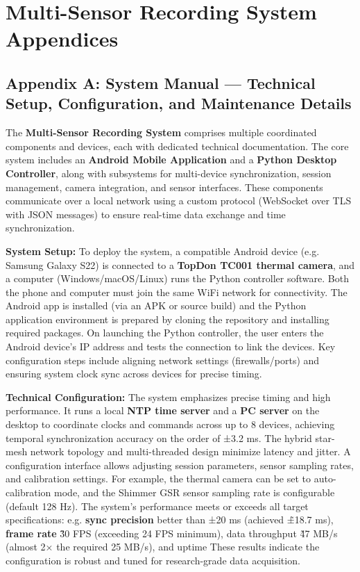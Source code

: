 \chapter{Multi-Sensor Recording System Appendices}

\section{Appendix A: System Manual --- Technical Setup, Configuration, and Maintenance Details}

The \textbf{Multi-Sensor Recording System} comprises multiple coordinated
components and devices, each with dedicated technical documentation. The
core system includes an \textbf{Android Mobile Application} and a \textbf{Python
Desktop Controller}, along with subsystems for multi-device
synchronization, session management, camera integration, and sensor
interfaces\cite{ref1}.
These components communicate over a local network using a custom
protocol (WebSocket over TLS with JSON messages) to ensure real-time
data exchange and time
synchronization\cite{ref2}.

\textbf{System Setup:} To deploy the system, a compatible Android device
(e.g. Samsung Galaxy S22) is connected to a \textbf{TopDon TC001 thermal
camera}, and a computer (Windows/macOS/Linux) runs the Python
controller
software\cite{ref3}.
Both the phone and computer must join the same WiFi network for
connectivity\cite{ref4}.
The Android app is installed (via an APK or source build) and the Python
application environment is prepared by cloning the repository and
installing required
packages\cite{ref5}.
On launching the Python controller, the user enters the Android
device's IP address and tests the connection to link the
devices\cite{ref6}.
Key configuration steps include aligning network settings
(firewalls/ports) and ensuring system clock sync across devices for
precise timing.

\textbf{Technical Configuration:} The system emphasizes precise timing and
high performance. It runs a local \textbf{NTP time server} and a \textbf{PC
server} on the desktop to coordinate clocks and commands across up to 8
devices, achieving temporal synchronization accuracy on the order of
±3.2
ms\cite{ref7}.
The hybrid star-mesh network topology and multi-threaded design minimize
latency and jitter. A configuration interface allows adjusting session
parameters, sensor sampling rates, and calibration settings. For
example, the thermal camera can be set to auto-calibration mode, and the
Shimmer GSR sensor sampling rate is configurable (default 128
Hz)\cite{ref8}\cite{ref9}.
The system's performance meets or exceeds all target specifications:
e.g. \textbf{sync precision} better than ±20 ms (achieved \~±18.7 ms),
\textbf{frame rate} \~30 FPS (exceeding 24 FPS minimum), data throughput \~47
MB/s (almost 2× the required 25 MB/s), and uptime
These results indicate the configuration is robust and tuned for
research-grade data acquisition.

